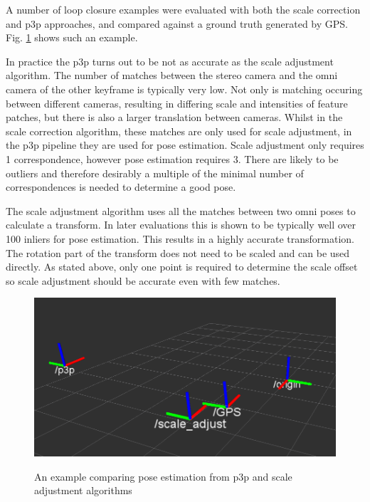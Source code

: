 A number of loop closure examples were evaluated with both the scale correction and p3p approaches, and compared against a ground truth generated by GPS.  Fig. \ref{fig:scale_vs_p3p} shows such an example.  

In practice the p3p turns out to be not as accurate as the scale adjustment algorithm.  The number of matches between the stereo camera and the omni camera of the other keyframe is typically very low.  Not only is matching occuring between different cameras, resulting in differing scale and intensities of feature patches, but there is also a larger translation between cameras. Whilst in the scale correction algorithm, these matches are only used for scale adjustment, in the p3p pipeline they are used for pose estimation.  Scale adjustment only requires 1 correspondence, however pose estimation requires 3.  There are likely to be outliers and therefore desirably a multiple of the minimal number of correspondences is needed to determine a good pose.

The scale adjustment algorithm uses all the matches between two omni poses to calculate a transform.  In later evaluations this is shown to be typically well over 100 inliers for pose estimation.  This results in a highly accurate transformation.  The rotation part of the transform does not need to be scaled and can be used directly.  As stated above, only one point is required to determine the scale offset so scale adjustment should be accurate even with few matches.

\begin{figure}[H]
  \centering
    \includegraphics[width=1.0\textwidth]{chapters/images/scale_vs_p3p_1}\\
  \caption{An example comparing pose estimation from p3p and scale adjustment algorithms}
  \label{fig:scale_vs_p3p}
\end{figure}

